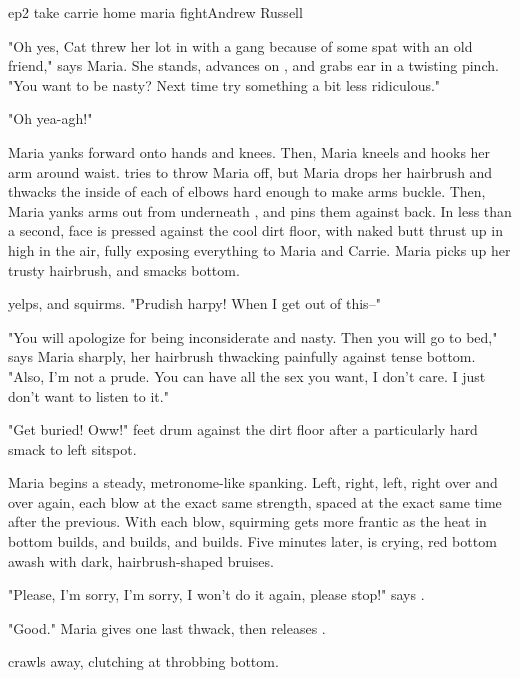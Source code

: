 \documentclass{book}
\begin{document}
\begin{childnode}{ep2 take carrie home maria fight}{Andrew Russell}


    "Oh yes, Cat threw her lot in with a gang because of some spat with an old friend," says Maria. She stands, advances on \name{}, and grabs \hisher{} ear in a twisting pinch. "You want to be nasty? Next time try something a bit less ridiculous."

    "Oh yea-agh!"

    Maria yanks \name{} forward onto \hisher{} hands and knees. Then, Maria kneels and hooks her arm around \names{} waist. \name{} tries to throw Maria off, but Maria drops her hairbrush and thwacks the inside of each of \names{}
    elbows hard enough to make \hisher{} arms buckle. Then, Maria yanks \names{} arms out from underneath \himher{}, and pins them against \hisher{} back. In less than a second, \names{} face is pressed against the 
    cool dirt floor, with \hisher{} naked butt thrust up in high in the air, fully exposing everything to Maria and Carrie. Maria picks up her trusty hairbrush, and smacks \names{} bottom. 

    \name{} yelps, and squirms. "Prudish harpy! When I get out of this--"

    "You will apologize for being inconsiderate and nasty. Then you will go to bed," says Maria sharply, her hairbrush thwacking painfully against \names{} tense bottom. "Also, I'm not a prude.
    You can have all the sex you want, I don't care. I just don't want to listen to it."

    "Get buried! Oww!" \names{} feet drum against the dirt floor after a particularly hard smack to \hisher{} left sitspot.

    Maria begins a steady, metronome-like spanking. Left, right, left, right over and over again, each blow at the exact same strength, spaced at the exact same time after the previous. With each
    blow, \name{} squirming gets more frantic as the heat in \hisher{} \muscleadj{} bottom builds, and builds, and builds.
    Five minutes later, \name{} is crying, \hisher{} red bottom awash with dark, hairbrush-shaped bruises.

    "Please, I'm sorry, I'm sorry, I won't do it again, please stop!" says \name{}.

    "Good." Maria gives \name{} one last thwack, then releases \himher{}.

    \name{} crawls away, clutching at \hisher{} throbbing bottom.


\end{childnode}
\end{document}
